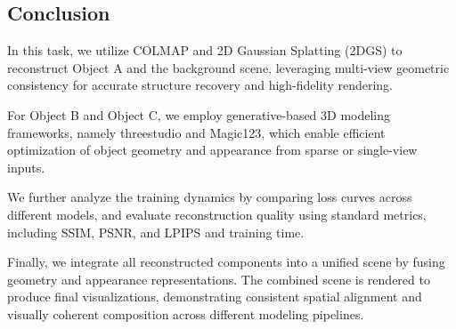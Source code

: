 \subsection{Conclusion}
In this task, we utilize COLMAP and 2D Gaussian Splatting (2DGS) to reconstruct Object A and the background scene, leveraging multi-view geometric consistency for accurate structure recovery and high-fidelity rendering. 

For Object B and Object C, we employ generative-based 3D modeling frameworks, namely threestudio and Magic123, which enable efficient optimization of object geometry and appearance from sparse or single-view inputs.

We further analyze the training dynamics by comparing loss curves across different models, and evaluate reconstruction quality using standard metrics, including SSIM, PSNR, and LPIPS and training time.

Finally, we integrate all reconstructed components into a unified scene by fusing geometry and appearance representations. The combined scene is rendered to produce final visualizations, demonstrating consistent spatial alignment and visually coherent composition across different modeling pipelines.